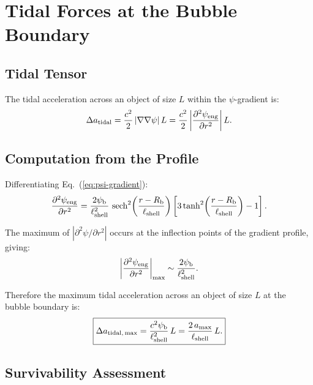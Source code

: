 \documentclass[12pt,aps,prd,superscriptaddress,nofootinbib]{revtex4-2}
\newcommand{\psib}{\psi_{\rm b}}
\newcommand{\Rb}{R_{\rm b}}
\newcommand{\Lshell}{\ell_{\rm shell}}
\begin{document}
\section{Tidal Forces at the Bubble Boundary}\label{sec:tidal}

\subsection{Tidal Tensor}

The tidal acceleration across an object of size $L$ within the
$\psi$-gradient is:
\begin{equation}
\Delta a_{\rm tidal} = \frac{c^2}{2}\,|\nabla\nabla\psi|\,L
= \frac{c^2}{2}\left|\frac{\partial^2\psi_{\rm eng}}
  {\partial r^2}\right| L.
\label{eq:tidal}
\end{equation}

\subsection{Computation from the Profile}

Differentiating Eq.~(\ref{eq:psi-gradient}):
\begin{equation}
\frac{\partial^2\psi_{\rm eng}}{\partial r^2}
= \frac{2\psib}{\Lshell^2}\,\operatorname{sech}^2\!\left(
  \frac{r-\Rb}{\Lshell}\right)\left[
  3\tanh^2\!\left(\frac{r-\Rb}{\Lshell}\right) - 1\right].
\end{equation}

The maximum of $|\partial^2\psi/\partial r^2|$ occurs at the
inflection points of the gradient profile, giving:
\begin{equation}
\left|\frac{\partial^2\psi_{\rm eng}}{\partial r^2}\right|_{\rm max}
\sim \frac{2\psib}{\Lshell^2}.
\end{equation}

Therefore the maximum tidal acceleration across an object of size $L$
at the bubble boundary is:
\begin{equation}
\boxed{\Delta a_{\rm tidal,\,max}
  = \frac{c^2\psib}{\Lshell^2}\,L
  = \frac{2\,a_{\rm max}}{\Lshell}\,L.}
\label{eq:tidal-max}
\end{equation}

\subsection{Survivability Assessment}
\end{document}
